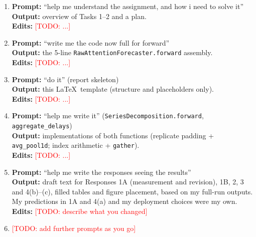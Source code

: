 \documentclass[11pt,a4paper]{article}
\newcommand{\todo}[1]{\textcolor{red}{[TODO: #1]}}
\begin{document}
\begin{enumerate}
  \item \textbf{Prompt:} ``help me understand the assignment, and how i need to solve it'' \\
        \textbf{Output:} overview of Tasks 1--2 and a plan. \\
        \textbf{Edits:} \todo{...}
  \item \textbf{Prompt:} ``write me the code now full for forward'' \\
        \textbf{Output:} the 5-line \texttt{RawAttentionForecaster.forward} assembly. \\
        \textbf{Edits:} \todo{...}
  \item \textbf{Prompt:} ``do it'' (report skeleton) \\
        \textbf{Output:} this \LaTeX\ template (structure and placeholders only). \\
        \textbf{Edits:} \todo{...}
  \item \textbf{Prompt:} ``help me write it'' (\texttt{SeriesDecomposition.forward}, \texttt{aggregate\_delays}) \\
        \textbf{Output:} implementations of both functions (replicate padding + \texttt{avg\_pool1d}; index arithmetic + \texttt{gather}). \\
        \textbf{Edits:} \todo{...}
  \item \textbf{Prompt:} ``help me write the responses seeing the results'' \\
        \textbf{Output:} draft text for Responses 1A (measurement and revision), 1B, 2, 3 and 4(b)--(c), filled tables and figure placement, based on my full-run outputs. My predictions in 1A and 4(a) and my deployment choices were my own. \\
        \textbf{Edits:} \todo{describe what you changed}
  \item \todo{add further prompts as you go}
\end{enumerate}
\end{document}
